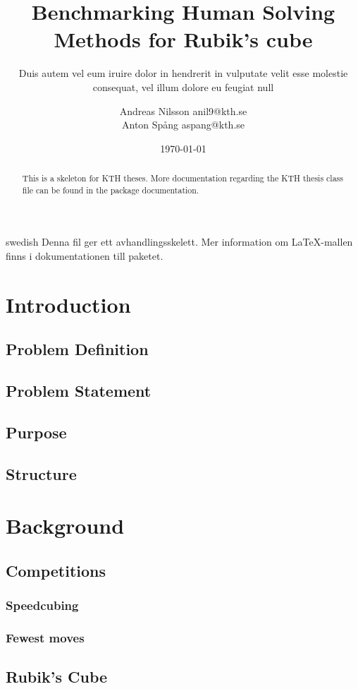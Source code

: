 \documentclass[a4paper,11pt]{kth-mag}
\title{Benchmarking Human Solving Methods for
           Rubik's cube}
\subtitle{Duis autem vel eum iruire dolor in hendrerit in
          vulputate velit esse molestie consequat, vel illum
          dolore eu feugiat null}
\author{Andreas Nilsson  anil9@kth.se\\Anton Spång  aspang@kth.se}
\date{\today}
\begin{document}
\frontmatter
\pagestyle{empty}
\removepagenumbers
\maketitle
{}
\begin{abstract}
  This is a skeleton for KTH theses. More documentation
  regarding the KTH thesis class file can be found in
  the package documentation.


\end{abstract}
\clearpage
\begin{foreignabstract}{swedish}
  Denna fil ger ett avhandlingsskelett.
  Mer information om \LaTeX-mallen finns i
  dokumentationen till paketet.


\end{foreignabstract}
\clearpage
\tableofcontents*
\mainmatter
\pagestyle{newchap}
\chapter{Introduction}
\section{Problem Definition}
\section{Problem Statement}
\section{Purpose}
\section{Structure}

\chapter{Background}
\section{Competitions}
\subsection{Speedcubing}
\subsection{Fewest moves}
\section{Rubik's Cube}
\end{document}
